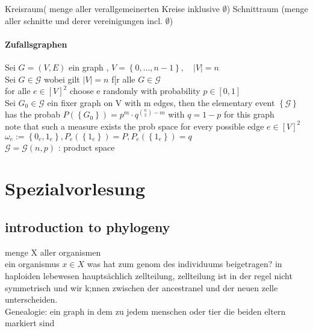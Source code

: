 \documentclass[a4paper]{article}
\theoremstyle{definition}
\theoremstyle{remark}
\begin{document}
Kreisraum( menge aller verallgemeinerten Kreise inklusive $\emptyset$)
Schnittraum (menge aller schnitte und derer vereinigungen incl. $\emptyset$)
\paragraph{Zufallsgraphen}
\label{par:zufallsgraphen}

Sei $G=(V,E)$ ein graph , $V=\left\{ 0,\dots,n-1 \right\}, \quad |V|=n$\\ 
Sei $G \in \mathcal{G}$ wobei gilt $|V|=n$ f[r alle $G \in \mathcal{G}$ \\
  for alle $e \in \left[ V \right]^{2} $ choose e randomly with probability  $ p\in [0,1]$\\
Sei $G_0 \in \mathcal{G}$ ein fixer graph on V with m edges, then the elementary event $\left\{ \mathcal{G} \right\}$ has the probab
$P\left( \left\{ G_0 \right\} \right)=p^m\cdot q^{\binom{n}{2}-m}$ with $q=1-p$ for this graph
\\ 
note that such a measure exists
the prob space for every possible edge $e\in [V]^2$ \\
$\omega _e :=\left\{ 0_e,1_e \right\}, P_e\left( \left\{ 1_e \right\} \right)=P, P_e\left( \left\{ 1_e \right\} \right)=q$\\
$\mathcal{G}=\mathcal{G}(n,p)$ : product space
\section{Spezialvorlesung}
\label{sec:spezialvorlesung}
\subsection{introduction to phylogeny}
\label{sub:introduction_to_phyogeny}

menge X aller organismen \\ 
ein organismus $x\in X$ was hat zum genom des individuums beigetragen?
in haploiden lebewesen hauptsächlich zellteilung, zellteilung ist in der regel nicht symmetrisch und wir k;nnen zwischen der ancestranel und der neuen zelle unterscheiden.\\
Genealogie: ein graph in dem zu jedem menschen oder tier die beiden eltern markiert sind
\end{document}
